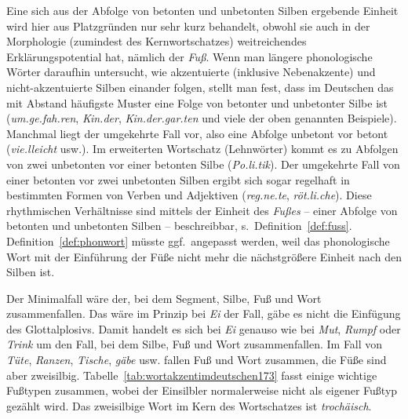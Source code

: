 \begin{exe}
  \ex\label{ex:wortakzentimdeutschen172}
  \begin{xlist}
  \end{xlist}
\end{exe}

Eine sich aus der Abfolge von betonten und unbetonten Silben ergebende Einheit wird hier aus Platzgründen nur sehr kurz behandelt, obwohl sie auch in der Morphologie (zumindest des Kernwortschatzes) weitreichendes Erklärungspotential hat, nämlich der \textit{Fuß}.
Wenn man längere phonologische Wörter daraufhin untersucht, wie akzentuierte (inklusive Nebenakzente) und nicht-akzentuierte Silben einander folgen, stellt man fest, dass im Deutschen das mit Abstand häufigste Muster eine Folge von betonter und unbetonter Silbe ist (\textit{\Akz um.ge.\Nakz fah.ren}, \textit{\Akz Kin.der}, \textit{\Akz Kin.der.\Nakz gar.ten} und viele der oben genannten Beispiele).
Manchmal liegt der umgekehrte Fall vor, also eine Abfolge unbetont vor betont (\textit{vie.\Akz lleicht} usw.).
Im erweiterten Wortschatz (\idR Lehnwörter) kommt es zu Abfolgen von zwei unbetonten vor einer betonten Silbe (\textit{Po.li.\Akz tik}).
Der umgekehrte Fall von einer betonten vor zwei unbetonten Silben ergibt sich sogar regelhaft in bestimmten Formen von Verben und Adjektiven (\textit{\Akz reg.ne.te}, \textit{\Akz röt.li.che}).
Diese rhythmischen Verhältnisse sind mittels der Einheit des \textit{Fußes} -- einer Abfolge von betonten und unbetonten Silben -- beschreibbar, s.\ Definition~\ref{def:fuss}.
Definition~\ref{def:phonwort} müsste ggf.\ angepasst werden, weil das phonologische Wort mit der Einführung der Füße nicht mehr die nächstgrößere Einheit nach den Silben ist.

{}

Der Minimalfall wäre der, bei dem Segment, Silbe, Fuß und Wort zusammenfallen.
Das wäre im Prinzip bei \textit{Ei} der Fall, gäbe es nicht die Einfügung des Glottalplosivs.
Damit handelt es sich bei \textit{Ei} genauso wie bei \textit{Mut}, \textit{Rumpf} oder \textit{Trink} um den Fall, bei dem Silbe, Fuß und Wort zusammenfallen.
Im Fall von \textit{\Akz Tüte}, \textit{\Akz Ranzen}, \textit{\Akz Tische}, \textit{\Akz gäbe} usw. fallen Fuß und Wort zusammen, die Füße sind aber zweisilbig.
Tabelle~\ref{tab:wortakzentimdeutschen173} fasst einige wichtige Fußtypen zusammen, wobei der Einsilbler normalerweise nicht als eigener Fußtyp gezählt wird.
Das zweisilbige Wort im Kern des Wortschatzes ist \textit{trochäisch}.


